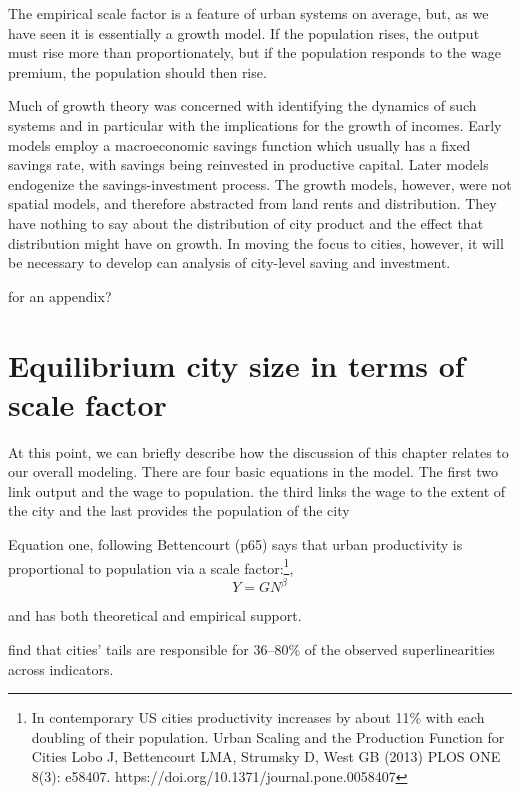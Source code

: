 \vspace{2cm}
The empirical scale factor is a feature of urban systems on average, but, as we have seen it is essentially a growth model. If the population rises, the output must rise more than proportionately, but if the population responds to the wage premium, the population should then rise. 

Much of growth theory was concerned with identifying the dynamics of such systems and in particular with the implications for the growth of incomes. Early models employ a macroeconomic savings function which usually has a fixed savings rate, with savings being reinvested in productive capital. Later models endogenize the savings-investment process. The growth models, however, were not spatial models, and therefore abstracted from land rents and distribution. They have nothing to say about the distribution of city product and the effect that distribution might have on growth. In moving the focus to cities, however, it will be necessary to develop can analysis of city-level saving and investment. 

\vspace{2cm}

\huge{for an appendix?}\normalsize
\section{Equilibrium city size  in terms of scale factor} 
At this point, we can briefly describe how the discussion of this chapter relates to our overall modeling. There are four basic equations in the model. The first two link output and the wage to population. the third links the wage to the extent of the city and the last  provides the population of the city

Equation one, following Bettencourt (p65) says that  urban productivity is proportional to population via a scale factor:\footnote{ In contemporary US cities productivity increases by about 11\% with each doubling of their population.  Urban Scaling and the Production Function for Cities Lobo J, Bettencourt LMA, Strumsky D, West GB (2013) PLOS ONE 8(3): e58407. https://doi.org/10.1371/journal.pone.0058407 }, 
\[Y= GN^{\beta}\]  

and has both theoretical and empirical support. 


\cite{arvidssonUrbanScalingLaws2023} find that cities’ tails are responsible for 36–80\% of the observed superlinearities across indicators. 


